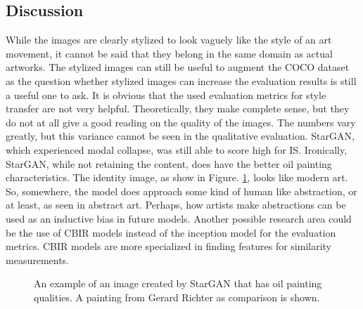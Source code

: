 \subsection{Discussion}
\label{sec:baseline_discussion_style_transfer}
While the images are clearly stylized to look vaguely like the style of an art movement, it cannot be said that they belong in the same domain as actual artworks.
The stylized images can still be useful to augment the COCO dataset as the question whether stylized images can increase the evaluation results is still a useful one to ask.
It is obvious that the used evaluation metrics for style transfer are not very helpful.
Theoretically, they make complete sense, but they do not at all give a good reading on the quality of the images.
The numbers vary greatly, but this variance cannot be seen in the qualitative evaluation.
StarGAN, which experienced modal collapse, was still able to score high for \gls{IS}.
Ironically, StarGAN, while not retaining the content, does have the better oil painting characteristics.
The identity image, as show in Figure. \ref{fig:style_transfer_stargan_identity_image}, looks like modern art.
So, somewhere, the model does approach some kind of human like abstraction, or at least, as seen in abstract art.
Perhaps, how artists make abstractions can be used as an inductive bias in future models.
Another possible research area could be the use of \gls{CBIR} models instead of the inception model for the evaluation metrics.
\gls{CBIR} models are more specialized in finding features for similarity measurements.

\begin{figure}[h]
    \centering
	\caption{
        An example of an image created by StarGAN that has oil painting qualities. A painting from Gerard Richter as comparison is shown.
    }
    \label{fig:style_transfer_stargan_identity_image}
\end{figure}

